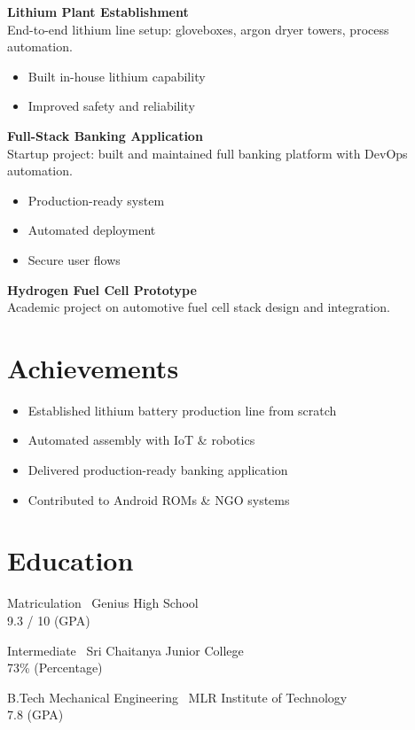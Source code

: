 \documentclass[11pt,a4paper]{article}
\begin{document}
\textbf{Lithium Plant Establishment} \\ End-to-end lithium line setup: gloveboxes, argon dryer towers, process automation.
\begin{itemize}
  \item Built in-house lithium capability
  \item Improved safety and reliability
\end{itemize}

\textbf{Full-Stack Banking Application} \\ Startup project: built and maintained full banking platform with DevOps automation.
\begin{itemize}
  \item Production-ready system
  \item Automated deployment
  \item Secure user flows
\end{itemize}

\textbf{Hydrogen Fuel Cell Prototype} \\ Academic project on automotive fuel cell stack design and integration.

\section*{Achievements}
\begin{itemize}
  \item Established lithium battery production line from scratch
  \item Automated assembly with IoT \& robotics
  \item Delivered production-ready banking application
  \item Contributed to Android ROMs \& NGO systems
\end{itemize}

\section*{Education}
Matriculation \textemdash\ Genius High School \\ \textcolor{muted}{9.3 / 10 (GPA)}

Intermediate \textemdash\ Sri Chaitanya Junior College \\ \textcolor{muted}{73\% (Percentage)}

B.Tech Mechanical Engineering \textemdash\ MLR Institute of Technology \\ \textcolor{muted}{7.8 (GPA)}
\end{document}
